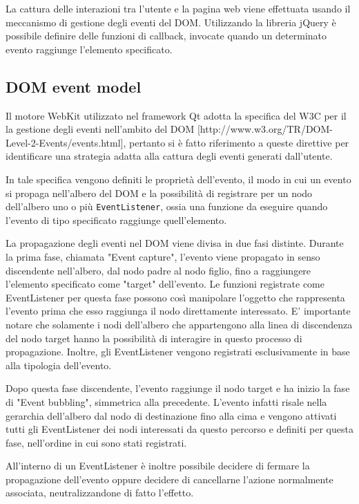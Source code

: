 \documentclass[12pt]{toptesi}
\begin{document}
La cattura delle interazioni tra l'utente e la pagina web viene effettuata usando il meccanismo di gestione degli eventi del DOM. Utilizzando la libreria jQuery è possibile definire delle funzioni di callback, invocate quando un determinato evento raggiunge l'elemento specificato. 

\subsection{DOM event model}

Il motore WebKit utilizzato nel framework Qt adotta la specifica del W3C per il la gestione degli eventi nell'ambito del DOM [http://www.w3.org/TR/DOM-Level-2-Events/events.html], pertanto si è fatto riferimento a queste direttive per identificare una strategia adatta alla cattura degli eventi generati dall'utente. 

In tale specifica vengono definiti le proprietà dell'evento, il modo in cui un evento si propaga nell'albero del DOM e la possibilità di registrare per un nodo dell'albero uno o più \verb|EventListener|, ossia una funzione da eseguire quando l'evento di tipo specificato raggiunge quell'elemento.

La propagazione degli eventi nel DOM viene divisa in due fasi distinte. Durante la prima fase, chiamata "Event capture", l'evento viene propagato in senso discendente nell'albero, dal nodo padre al nodo figlio, fino a raggiungere l'elemento specificato come "target" dell'evento. Le funzioni registrate come EventListener per questa fase possono così manipolare l'oggetto che rappresenta l'evento prima che esso raggiunga il nodo direttamente interessato. E' importante notare che solamente i nodi dell'albero che appartengono alla linea di discendenza del nodo target hanno la possibilità di interagire in questo processo di propagazione. Inoltre, gli EventListener vengono registrati esclusivamente in base alla tipologia dell'evento.

Dopo questa fase discendente, l'evento raggiunge il nodo target e ha inizio la fase di "Event bubbling", simmetrica alla precedente. L'evento infatti risale nella gerarchia dell'albero dal nodo di destinazione fino alla cima e vengono attivati tutti gli EventListener dei nodi interessati da questo percorso e definiti per questa fase, nell'ordine in cui sono stati registrati.

All'interno di un EventListener è inoltre possibile decidere di fermare la propagazione dell'evento oppure decidere di cancellarne l'azione normalmente associata, neutralizzandone di fatto l'effetto.
\end{document}
